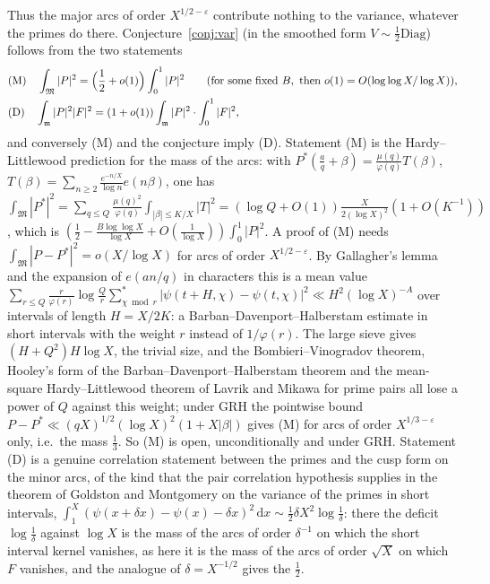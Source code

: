 \documentclass[11pt]{amsart}
\theoremstyle{remark}
\newcommand{\dd}{\,\mathrm d}
\newcommand{\e}{\varepsilon}
\begin{document}
Thus the major arcs of order $X^{1/2-\e}$ contribute nothing to the variance, whatever the primes do there. Conjecture~\ref{conj:var} (in the smoothed form $V\sim\frac12\mathrm{Diag}$) follows from the two statements
\begin{align*}
&\textup{(M)}\quad \int_{\mathfrak M}|P|^2=\Bigl(\frac12+o(1)\Bigr)\int_0^1|P|^2\qquad(\text{for some fixed }B,\ \text{then }o(1)=O(\log\log X/\log X)),\\
&\textup{(D)}\quad \int_{\mathfrak m}|P|^2|F|^2=(1+o(1))\int_{\mathfrak m}|P|^2\cdot\int_0^1|F|^2,
\end{align*}
and conversely (M) and the conjecture imply (D). Statement (M) is the Hardy--Littlewood prediction for the mass of the arcs: with $P^*(\frac aq+\beta)=\frac{\mu(q)}{\varphi(q)}T(\beta)$, $T(\beta)=\sum_{n\ge2}\frac{e^{-n/X}}{\log n}e(n\beta)$, one has $\int_{\mathfrak M}|P^*|^2=\sum_{q\le Q}\frac{\mu(q)^2}{\varphi(q)}\int_{|\beta|\le K/X}|T|^2=(\log Q+O(1))\frac X{2(\log X)^2}(1+O(K^{-1}))$, which is $(\frac12-\frac{B\log\log X}{\log X}+O(\frac1{\log X}))\int_0^1|P|^2$. A proof of (M) needs $\int_{\mathfrak M}|P-P^*|^2=o(X/\log X)$ for arcs of order $X^{1/2-\e}$. By Gallagher's lemma and the expansion of $e(an/q)$ in characters this is a mean value $\sum_{r\le Q}\frac r{\varphi(r)}\log\frac Qr\sum_{\chi\bmod r}^*|\psi(t+H,\chi)-\psi(t,\chi)|^2\ll H^2(\log X)^{-A}$ over intervals of length $H=X/2K$: a Barban--Davenport--Halberstam estimate in short intervals with the weight $r$ instead of $1/\varphi(r)$. The large sieve gives $(H+Q^2)H\log X$, the trivial size, and the Bombieri--Vinogradov theorem, Hooley's form of the Barban--Davenport--Halberstam theorem and the mean-square Hardy--Littlewood theorem of Lavrik and Mikawa for prime pairs all lose a power of $Q$ against this weight; under GRH the pointwise bound $P-P^*\ll(qX)^{1/2}(\log X)^2(1+X|\beta|)$ gives (M) for arcs of order $X^{1/3-\e}$ only, i.e.\ the mass $\frac13$. So (M) is open, unconditionally and under GRH. Statement (D) is a genuine correlation statement between the primes and the cusp form on the minor arcs, of the kind that the pair correlation hypothesis supplies in the theorem of Goldston and Montgomery \cite{GM} on the variance of the primes in short intervals, $\int_1^X(\psi(x+\delta x)-\psi(x)-\delta x)^2\dd x\sim\frac12\delta X^2\log\frac1\delta$: there the deficit $\log\frac1\delta$ against $\log X$ is the mass of the arcs of order $\delta^{-1}$ on which the short interval kernel vanishes, as here it is the mass of the arcs of order $\sqrt X$ on which $F$ vanishes, and the analogue of $\delta=X^{-1/2}$ gives the $\frac12$.
\end{document}

